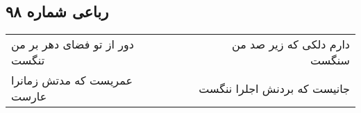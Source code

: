 \begin{center}
\section*{رباعی شماره ۹۸}
\label{sec:sh098}
\begin{longtable}{l p{0.5cm} r}
دور از تو فضای دهر بر من تنگست
&&
دارم دلکی که زیر صد من سنگست
\\
عمریست که مدتش زمانرا عارست
&&
جانیست که بردنش اجلرا ننگست
\\
\end{longtable}
\end{center}
